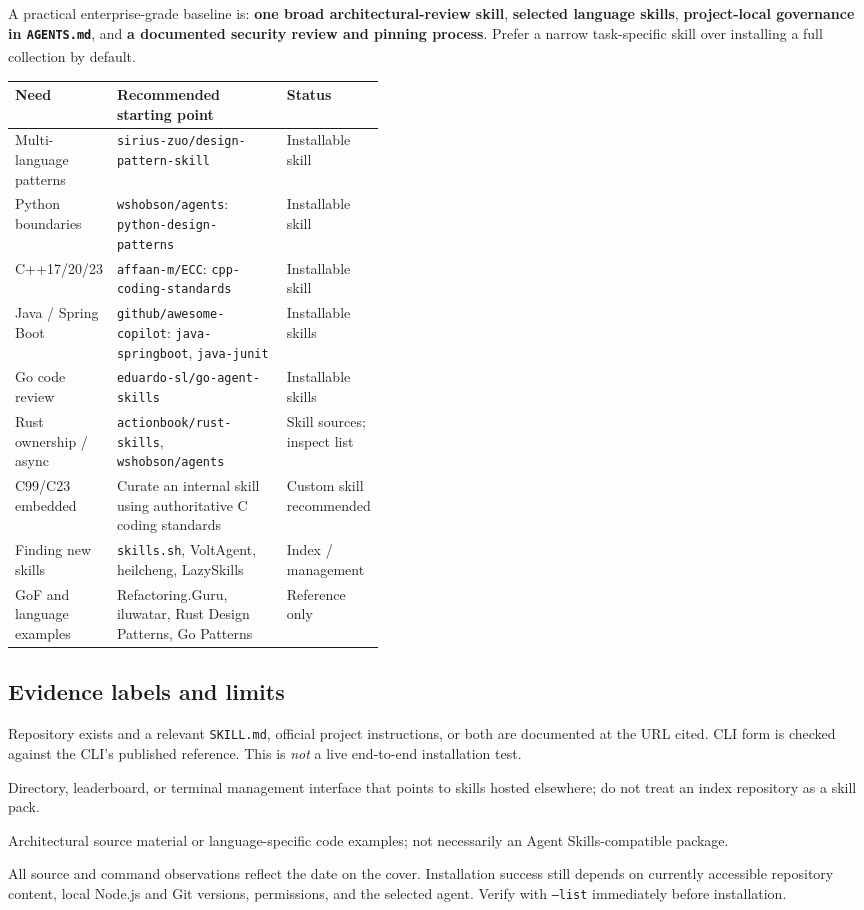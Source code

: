 \documentclass[11pt,letterpaper]{article}
\newcommand{\src}[1]{\textsuperscript{\textcolor{teal}{\cite{#1}}}}
\newcommand{\repo}[1]{\texttt{#1}}
\newcommand{\pass}{\textcolor{teal}{\textbf{VERIFIED}}}
\newcommand{\indexonly}{\textcolor{gold}{\textbf{INDEX}}}
\newcommand{\refonly}{\textcolor{bluegray}{\textbf{REFERENCE}}}
\begin{document}
A practical enterprise-grade baseline is: \textbf{one broad architectural-review skill}, \textbf{selected language skills}, \textbf{project-local governance in \texttt{AGENTS.md}}, and \textbf{a documented security review and pinning process}. Prefer a narrow task-specific skill over installing a full collection by default.\src{sirius,wshobson,agentsmd}

\begin{tabularx}{\linewidth}{@{}p{0.18\linewidth}X p{0.25\linewidth}@{}}
\toprule
\textbf{Need} & \textbf{Recommended starting point} & \textbf{Status}\\\midrule
Multi-language patterns & \repo{sirius-zuo/design-pattern-skill} & Installable skill\\
Python boundaries & \repo{wshobson/agents}: \repo{python-design-patterns} & Installable skill\\
C++17/20/23 & \repo{affaan-m/ECC}: \repo{cpp-coding-standards} & Installable skill\\
Java / Spring Boot & \repo{github/awesome-copilot}: \repo{java-springboot}, \repo{java-junit} & Installable skills\\
Go code review & \repo{eduardo-sl/go-agent-skills} & Installable skills\\
Rust ownership / async & \repo{actionbook/rust-skills}, \repo{wshobson/agents} & Skill sources; inspect list\\
C99/C23 embedded & Curate an internal skill using authoritative C coding standards & Custom skill recommended\\
Finding new skills & \repo{skills.sh}, VoltAgent, heilcheng, LazySkills & Index / management\\
GoF and language examples & Refactoring.Guru, iluwatar, Rust Design Patterns, Go Patterns & Reference only\\
\bottomrule
\end{tabularx}

\subsection{Evidence labels and limits}
\begin{description}[leftmargin=2.6cm,style=nextline]
\item[\pass] Repository exists and a relevant \texttt{SKILL.md}, official project instructions, or both are documented at the URL cited. CLI form is checked against the CLI's published reference. This is \emph{not} a live end-to-end installation test.
\item[\indexonly] Directory, leaderboard, or terminal management interface that points to skills hosted elsewhere; do not treat an index repository as a skill pack.
\item[\refonly] Architectural source material or language-specific code examples; not necessarily an Agent Skills-compatible package.
\end{description}
All source and command observations reflect the date on the cover. Installation success still depends on currently accessible repository content, local Node.js and Git versions, permissions, and the selected agent. Verify with \texttt{--list} immediately before installation.
\end{document}
